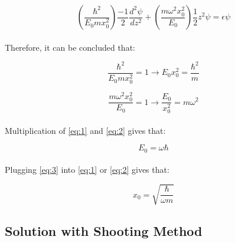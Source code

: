 \documentclass[letterpaper,12pt]{article}
\begin{document}
\begin{equation*}
    \left(\frac{\hbar^2}{E_0 m x_0^2}\right)\frac{-1}{2}\frac{d^2\psi}{dz^2} + \left(\frac{m\omega^2x_0^2}{E_0}\right) \frac{1}{2}z^2\psi = \epsilon\psi
\end{equation*}

\paragraph{} Therefore, it can be concluded that:

\begin{equation}
    \label{eq:1}
    \frac{\hbar^2}{E_0 m x_0^2} = 1 \rightarrow  E_0 x_0^2 = \frac{\hbar^2}{m}
\end{equation}

\begin{equation}
    \label{eq:2}
    \frac{m\omega^2x_0^2}{E_0} = 1 \rightarrow \frac{E_0}{x_0^2} = m\omega^2
\end{equation}

\paragraph{}Multiplication of \eqref{eq:1} and \eqref{eq:2} gives that:

\begin{equation}
    \label{eq:3}
   \boxed{ E_0 = \omega\hbar }
\end{equation}

\paragraph{} Plugging \eqref{eq:3} into \eqref{eq:1} or \eqref{eq:2} gives that:

\begin{equation*}
    \boxed{x_0 = \sqrt{\frac{\hbar}{\omega m}}}
\end{equation*}




\subsection{Solution with Shooting Method}
\end{document}
